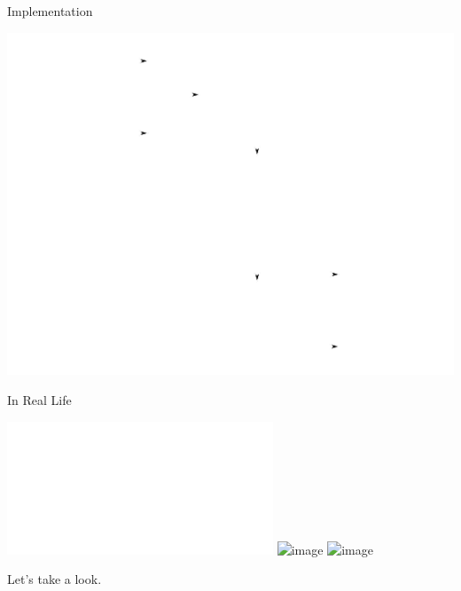 \documentclass[10pt]{beamer}
\begin{document}
\begin{frame}{Implementation}
    \begin{center}
        \includegraphics{fig/hwarch.pdf}
    \end{center}
\end{frame}

\begin{frame}{In Real Life}
    \begin{center}
        \includegraphics<1>{fig/dcbias.pdf}
        \includegraphics<2>[scale=0.45]{fig/dcbiasbrd.jpg}
        \includegraphics<3>[scale=0.5]{fig/setup.jpg}
    \end{center}
\end{frame}

\begin{frame}
    \begin{center}
        Let's take a look.
    \end{center}
\end{frame}
\end{document}
